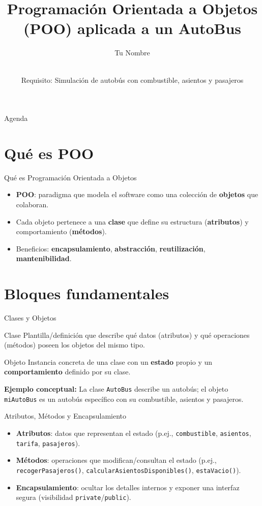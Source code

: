 \documentclass[aspectratio=169]{beamer}
\title[POO e AutoBus]{Programación Orientada a Objetos (POO) aplicada a un AutoBus}
\author{Tu Nombre}
\institute{COM200}
\date{\\\small Requisito: Simulación de autobús con combustible, asientos y pasajeros}
\begin{document}
\begin{frame}
  \titlepage
\end{frame}

\begin{frame}{Agenda}
  \tableofcontents
\end{frame}

\section{Qué es POO}

\begin{frame}{Qué es Programación Orientada a Objetos}
  \begin{itemize}
    \item \textbf{POO}: paradigma que modela el software como una colección de \textbf{objetos} que colaboran.
    \item Cada objeto pertenece a una \textbf{clase} que define su estructura (\textbf{atributos}) y comportamiento (\textbf{métodos}).
    \item Beneficios: \textbf{encapsulamiento}, \textbf{abstracción}, \textbf{reutilización}, \textbf{mantenibilidad}.
  \end{itemize}
\end{frame}

\section{Bloques fundamentales}

\begin{frame}{Clases y Objetos}
  \begin{block}{Clase}
    Plantilla/definición que describe qué datos (atributos) y qué operaciones (métodos) poseen los objetos del mismo tipo.
  \end{block}
  \begin{block}{Objeto}
    Instancia concreta de una clase con un \textbf{estado} propio y un \textbf{comportamiento} definido por su clase.
  \end{block}
  \vspace{4pt}
  \textbf{Ejemplo conceptual:} La clase \texttt{AutoBus} describe un autobús; el objeto \texttt{miAutoBus} es un autobús específico con su combustible, asientos y pasajeros.
\end{frame}

\begin{frame}{Atributos, Métodos y Encapsulamiento}
  \begin{itemize}
    \item \textbf{Atributos}: datos que representan el estado (p.ej., \texttt{combustible}, \texttt{asientos}, \texttt{tarifa}, \texttt{pasajeros}).
    \item \textbf{Métodos}: operaciones que modifican/consultan el estado (p.ej., \texttt{recogerPasajeros()}, \texttt{calcularAsientosDisponibles()}, \texttt{estaVacio()}).
    \item \textbf{Encapsulamiento}: ocultar los detalles internos y exponer una interfaz segura (visibilidad \texttt{private}/\texttt{public}).
  \end{itemize}
\end{frame}
\end{document}
